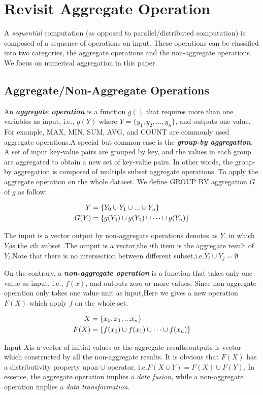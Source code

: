 \section{Revisit Aggregate Operation}
\label{sec:aggre}

A \emph{sequential} computation (as opposed to parallel/distributed computation) is composed of a sequence of operations on input. These operations can be classified into two categories, the aggregate operations and the non-aggregate operations. We focus on numerical aggregation in this paper.
 \subsection{Aggregate/Non-Aggregate Operations}
An \emph{\textbf{aggregate operation}} is a function $g()$ that requires more than one variables as input, i.e., $g(Y)$ where $Y=\{y_1, y_2, \ldots, y_n\}$, and outputs one value. For example, MAX, MIN, SUM, AVG, and COUNT are commonly used aggregate operations.A special but common case is the \emph{\textbf{group-by aggregation}}. A set of input key-value pairs are grouped by key, and the values in each group are aggregated to obtain a new set of key-value pairs. In other words, the group-by aggregation is composed of multiple subset aggregate operations.
To apply the aggregate operation on the whole dataset. We define GROUP BY aggregation $G$ of $g$ as follow: 
\begin{definition}
	\begin{align}
		 Y&=\{Y_0 \cup Y_1 \cup ... \cup Y_n\}\notag\\	 
	 G(Y)&=\{g(Y_0) \cup g(Y_1) \cup \dots \cup g(Y_n)\} \notag
 \end{align}
\end{definition}

The input is a vector output by non-aggregate operations denotes as $Y$. in which $Y_i$is the $i$th subset .The output is a vector,the $i$th item is the aggregate result of $Y_i$.Note that there is no intersection between different subset,i.e.$Y_i \cup Y_j = \emptyset $
 
On the contrary, a \emph{\textbf{non-aggregate operation}} is a function that takes only one value as input, i.e., $f(x)$, and outputs zero or more values. Since non-aggregate operation only takes one value unit as input,Here we gives a new operation $F(X)$ which apply $f$ on the whole set.\begin{definition}
	\begin{align}
	X&=\{x_0, x_1, ... x_n\}\notag\\	 
	F(X)&=\{f(x_0) \cup f(x_1) \cup \dots \cup f(x_n)\} \notag
	\end{align}
\end{definition}
Input $X$is a vector of  initial values or the aggregate results.outputs is vector which constructed by all the non-aggregate results. 
 It is obvious that $F(X)$ has a distributivity property upon $\cup$ operator, i.e.$F(X \cup Y)=F(X) \cup F(Y)$.
In essence, the aggregate operation implies a \emph{data fusion}, while a non-aggregate operation implies a \emph{data transformation}.

